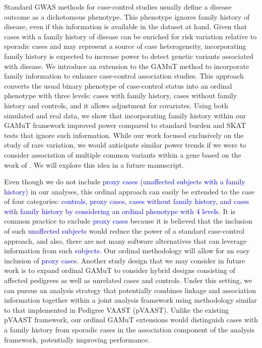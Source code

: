 \documentclass[]{article}
\begin{document}
Standard GWAS methods for case-control studies usually define a disease outcome as a dichotomous phenotype. This phenotype ignores family history of disease, even if this information is available in the dataset at hand. Given that cases with a family history of disease can be enriched for risk variation relative to sporadic cases and may represent a source of case heterogeneity, incorporating family history is expected to increase power to detect genetic variants associated with disease. We introduce an extension to the GAMuT method \citep{Broadaway2016} to incorporate family information to enhance case-control association studies. This approach converts the usual binary phenotype of case-control status into an ordinal phenotype with three levels: cases with family history, cases without family history and controls, and it allows adjustment for covariates. Using both simulated and real data, we show that incorporating family history within our GAMuT framework improved power compared to standard burden and SKAT tests that ignore such information. While our work focused exclusively on the study of rare variation, we would anticipate similar power trends if we were to consider association of multiple common variants within a gene based on the work of \citet{TengRisch1999}. We will explore this idea in a future manuscript.

Even though we do not include \textcolor{blue}{proxy cases (unaffected subjects with a family history)} in our analyses, this ordinal approach can easily be extended to the case of four categories: \textcolor{blue}{controls, proxy cases, cases without family history, and cases with family history by considering an ordinal phenotype with 4 levels.} It is common practice to exclude \textcolor{blue}{proxy cases} because it is believed that the inclusion of such \textcolor{blue}{unaffected subjects} would reduce the power of a standard case-control approach, and also, there are not many software alternatives that can leverage information from such \textcolor{blue}{subjects.} Our ordinal methodology will allow for an easy inclusion of \textcolor{blue}{proxy cases}. Another study design that we may consider in future work is to expand ordinal GAMuT to consider hybrid designs consisting of affected pedigrees as well as unrelated cases and controls. Under this setting, we can pursue an analysis strategy that potentially combines linkage and association information together within a joint analysis framework using methodology similar to that implemented in Pedigree VAAST (pVAAST)\citep{Hu2014}. Unlike the existing pVAAST framework, our ordinal GAMuT extensions would distinguish cases with a family history from sporadic cases in the association component of the analysis framework, potentially improving performance.
\end{document}
